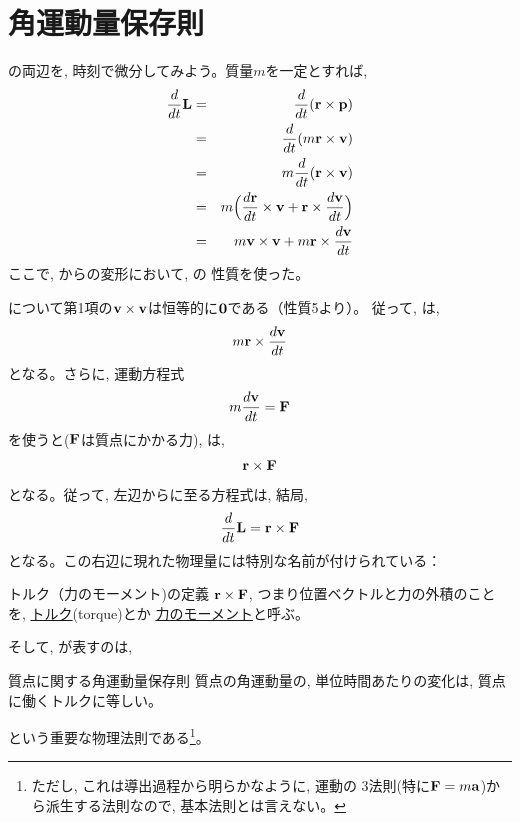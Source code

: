 \section{角運動量保存則}

の両辺を, 時刻で微分してみよう。質量$m$を一定とすれば, 
\begin{eqnarray}
\frac{d}{dt}{\bf L}&=&\frac{d}{dt}({\bf r}\times {\bf p})\label{eq:dLdt1}\\
                    &=&\frac{d}{dt}(m{\bf r}\times{\bf v})\label{eq:dLdt2}\\
                    &=&m\frac{d}{dt}({\bf r}\times{\bf v})\label{eq:dLdt3}\\
                    &=&m\Bigl(\frac{d{\bf r}}{dt}\times{\bf v}+{\bf r}\times\frac{d{\bf v}}{dt}\Bigr)\label{eq:dLdt4}\\
                    &=&m{\bf v}\times{\bf v}+m{\bf r}\times\frac{d{\bf v}}{dt}\label{eq:dLdt5}
\end{eqnarray}
ここで, からの変形において, の
性質を使った。

について第1項の${\bf v}\times{\bf v}$は恒等的に${\bf 0}$である（性質5より）。
従って, は, 
\begin{eqnarray}
m{\bf r}\times\frac{d{\bf v}}{dt}\label{eq:dLdt6}
\end{eqnarray}
となる。さらに, 運動方程式
\begin{eqnarray}
m\frac{d{\bf v}}{dt}={\bf F}
\end{eqnarray}
を使うと(${\bf F}$は質点にかかる力), は, 
\begin{eqnarray} 
{\bf r}\times{\bf F}
\end{eqnarray} 
となる。従って, 左辺からに至る方程式は, 結局, 
\begin{eqnarray} 
\frac{d}{dt}{\bf L}={\bf r}\times{\bf F}\label{eq:angmomtorq}
\end{eqnarray} 
となる。この右辺に現れた物理量には特別な名前が付けられている：
\begin{itembox}{トルク（力のモーメント)の定義}
${\bf r}\times{\bf F}$, つまり位置ベクトルと力の外積のことを, 
\underline{トルク}(torque)とか
\underline{力のモーメント}と呼ぶ。
\end{itembox}

そして, が表すのは, 
\begin{itembox}{質点に関する角運動量保存則}
質点の角運動量の, 単位時間あたりの変化は, 質点に働くトルクに等しい。
\end{itembox}
という重要な物理法則である\footnote{ただし, これは導出過程から明らかなように, 運動の
3法則(特に${\bf F}=m{\bf a}$)から派生する法則なので, 基本法則とは言えない。}。\mv

